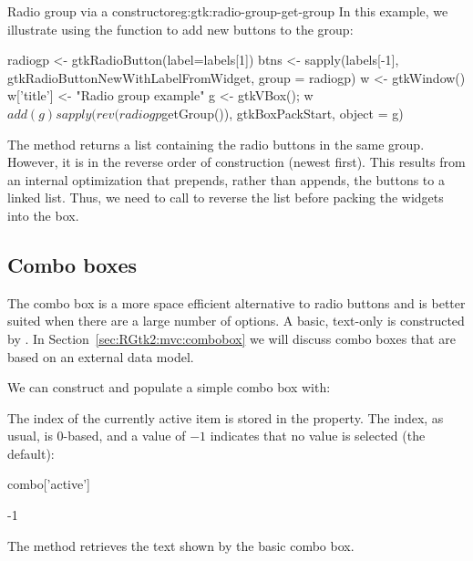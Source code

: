 \begin{example}{Radio group via a 
    constructor}{eg:gtk:radio-group-get-group}
  In this example, we illustrate using the
   function to add
  new buttons to the group:
\begin{Schunk}
\begin{Sinput}
 radiogp <- gtkRadioButton(label=labels[1])
 btns <- sapply(labels[-1], gtkRadioButtonNewWithLabelFromWidget, 
                group = radiogp)
 w <- gtkWindow()
 w['title'] <- "Radio group example"
 g <- gtkVBox(); w$add(g)
 sapply(rev(radiogp$getGroup()), gtkBoxPackStart, object = g)
\end{Sinput}
\end{Schunk}
%
The  method returns a list containing
the radio buttons in the same group. However, it is in the reverse
order of construction (newest first). This results from an internal
optimization that prepends, rather than appends, the buttons to a
linked list. Thus, we need to call  to reverse the list
before packing the widgets into the box.

\end{example}

\subsection{Combo boxes}
\label{sec:RGtk2:basic-combobox}

The combo box is a more space efficient alternative to radio buttons
and is better suited when there are a large number of options. A
basic, text-only  is constructed by
. In
Section~\ref{sec:RGtk2:mvc:combobox} we will discuss combo boxes that
are based on an external data model.

We can construct and populate a simple combo box with:
\begin{Schunk}
\end{Schunk}
%

The index of the currently active item is stored in the
 property. The index, as usual, is $0$-based,
and a value of $-1$ indicates that no value is selected (the default):
\begin{Schunk}
\begin{Sinput}
 combo['active']
\end{Sinput}
\begin{Soutput}
[1] -1
\end{Soutput}
\end{Schunk}
%
The  method retrieves
the text shown by the basic combo box.

